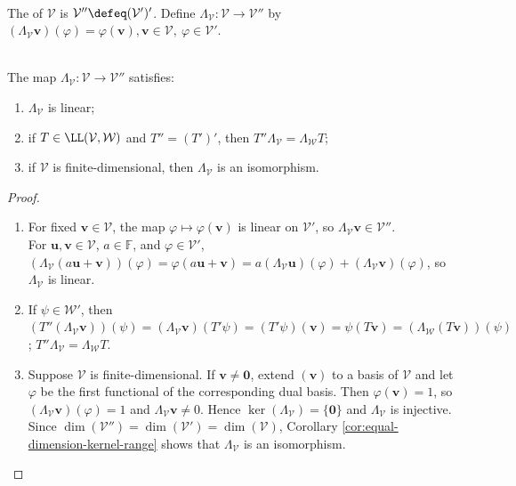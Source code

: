 \begin{definition} \\
The  of $\mathcal{V}$ is $\mathcal{V}''\defeq(\mathcal{V}')'$. Define $\Lambda_{\mathcal{V}}:\mathcal{V}\to\mathcal{V}''$ by $(\Lambda_{\mathcal{V}}\mathbf{v})(\varphi)=\varphi(\mathbf{v}), \mathbf{v}\in\mathcal{V},\ \varphi\in\mathcal{V}'$.
\end{definition}

\begin{theorem} \label{thm:natural-map-to-double-dual} \\
The map $\Lambda_{\mathcal{V}}:\mathcal{V}\to\mathcal{V}''$ satisfies:
\begin{enumerate}[label=(\roman*)]
\setlength{\itemsep}{0pt}
\item $\Lambda_{\mathcal{V}}$ is linear;
\item if $T\in\LL(\mathcal{V},\mathcal{W})$ and $T''=(T')'$, then $T''\Lambda_{\mathcal{V}}=\Lambda_{\mathcal{W}}T$;
\item if $\mathcal{V}$ is finite-dimensional, then $\Lambda_{\mathcal{V}}$ is an isomorphism.
\end{enumerate}
\begin{proof}
\begin{enumerate}[label=(\roman*)]
\setlength{\itemsep}{0pt}
\item
For fixed $\mathbf{v}\in\mathcal{V}$, the map $\varphi\mapsto\varphi(\mathbf{v})$ is linear on $\mathcal{V}'$, so $\Lambda_{\mathcal{V}}\mathbf{v}\in\mathcal{V}''$.\\
For $\mathbf{u},\mathbf{v}\in\mathcal{V}$, $a\in\mathbb{F}$, and $\varphi\in\mathcal{V}'$, $(\Lambda_{\mathcal{V}}(a\mathbf{u}+\mathbf{v}))(\varphi) =\varphi(a\mathbf{u}+\mathbf{v}) =a(\Lambda_{\mathcal{V}}\mathbf{u})(\varphi)+(\Lambda_{\mathcal{V}}\mathbf{v})(\varphi)$, so $\Lambda_{\mathcal{V}}$ is linear.\\
\item If $\psi\in\mathcal{W}'$, then $\left(T''(\Lambda_{\mathcal{V}}\mathbf{v})\right)(\psi) =(\Lambda_{\mathcal{V}}\mathbf{v})(T'\psi) =(T'\psi)(\mathbf{v}) =\psi(T\mathbf{v}) =\left(\Lambda_{\mathcal{W}}(T\mathbf{v})\right)(\psi)$; $T''\Lambda_{\mathcal{V}}=\Lambda_{\mathcal{W}}T$.\\
\item
Suppose $\mathcal{V}$ is finite-dimensional. If $\mathbf{v}\neq\mathbf{0}$, extend $(\mathbf{v})$ to a basis of $\mathcal{V}$ and let $\varphi$ be the first functional of the corresponding dual basis. Then $\varphi(\mathbf{v})=1$, so $(\Lambda_{\mathcal{V}}\mathbf{v})(\varphi)=1$ and $\Lambda_{\mathcal{V}}\mathbf{v}\neq0$. Hence $\ker(\Lambda_{\mathcal{V}})=\{\mathbf{0}\}$ and $\Lambda_{\mathcal{V}}$ is injective. Since $\dim(\mathcal{V}'')=\dim(\mathcal{V}')=\dim(\mathcal{V})$, Corollary \ref{cor:equal-dimension-kernel-range} shows that $\Lambda_{\mathcal{V}}$ is an isomorphism.

\end{enumerate}
\end{proof}
\end{theorem}
